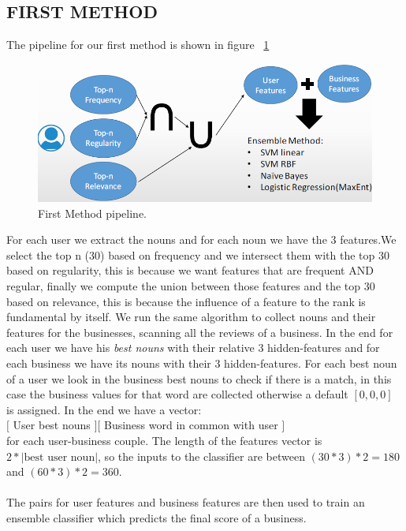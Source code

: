 \documentclass[11pt]{article}
\begin{document}
\subsection{FIRST METHOD}
The pipeline for our first method is shown in figure ~\ref{first} 
\begin{figure}[thpb]
	\includegraphics[scale=0.35]{img/firstMethod.png}
	\caption{First Method pipeline.}
	\label{first}
\end{figure}	
For each user we extract the nouns and for each noun 
 we have the 3 features.We select the top n (30) based on frequency and we intersect them with the top 30 based on regularity, this is because we want features that are frequent AND regular, finally we compute the union between those features and the top 30 based on relevance, this is because the influence of a feature to the rank is fundamental by itself. 
We run the same algorithm to collect nouns and their features for the businesses, scanning all the reviews of a business.
In the end for each user we have his\textit{ best nouns} with their relative 3 hidden-features and for each business we have its nouns with their 3 hidden-features. For each best noun of a user we look in the business best nouns to check if there is a match, in this case the business values for that word are collected otherwise a default $[0,0,0]$ is assigned.
In the end we have a vector:\\
$[$ User best nouns $]  [$ Business word in common with user $]$\\
for each user-business couple.
The length of the features vector is $2 * |\text{best user noun}|$, so the inputs to the classifier are between $(30*3)*2=180$ and $(60*3)*2=360$.\\\\
The pairs for user features and business features are then used to train an ensemble classifier which predicts the final score of a business.
\end{document}
